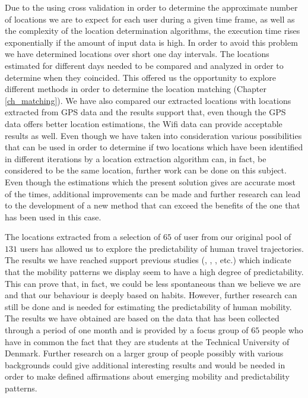 Due to the using cross validation in order to determine the approximate number
of locations we are to expect for each user during a given time frame, as well
as the complexity of the location determination algorithms, the execution time
rises exponentially if the amount of input data is high. In order to avoid this
problem we have determined locations over short one day intervals. The locations
estimated for different days needed to be compared and analyzed in order to
determine when they coincided. This offered us the opportunity to explore
different methods in order to determine the location matching (Chapter
\ref{ch_matching}). We have also compared our extracted locations with locations
extracted from GPS data and the results support that, even though the GPS data
offers better location estimations, the Wifi data can provide acceptable results
as well. Even though we have taken into consideration various possibilities that
can be used in order to determine if two locations which have been identified in
different iterations by a location extraction algorithm can, in fact, be
considered to be the same location, further work can be done on this subject.
Even though the estimations which the present solution gives are accurate most
of the times, additional improvements can be made and further research can lead
to the development of a new method that can exceed the benefits of the one that
has been used in this case.

The locations extracted from a selection of $65$ of user from our original pool
of $131$ users has allowed us to explore the predictability of human travel
trajectories. The results we have reached support previous studies
(\cite{Barabasi10}, \cite{Barabasi08}, \cite{Sinatra14}, \cite{Brockmann06}
etc.) which indicate that the mobility patterns we display seem to have a high
degree of predictability. This can prove that, in fact, we could be less
spontaneous than we believe we are and that our behaviour is deeply based on
habits. However, further research can still be done and is needed for estimating
the predictability of human mobility. The results we have obtained are based on
the data that has been collected through a period of one month and is provided
by a focus group of $65$ people who have in common the fact that they are
students at the Technical University of Denmark. Further research on a larger
group of people possibly with various backgrounds could give additional
interesting results and would be needed in order to make defined affirmations
about emerging mobility and predictability patterns.

